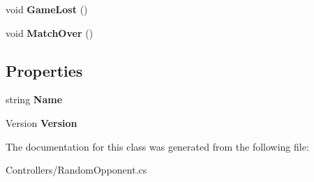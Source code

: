\begin{DoxyCompactItemize}
\item 
\hypertarget{class_m_b_c_1_1_controllers_1_1_random_bot_adcf9ec0052ac4f20b102979a4ed0771b}{void {\bfseries Game\-Lost} ()}\label{class_m_b_c_1_1_controllers_1_1_random_bot_adcf9ec0052ac4f20b102979a4ed0771b}

\item 
\hypertarget{class_m_b_c_1_1_controllers_1_1_random_bot_a5e0fd0e964cb95bbc22067b3915b2b1e}{void {\bfseries Match\-Over} ()}\label{class_m_b_c_1_1_controllers_1_1_random_bot_a5e0fd0e964cb95bbc22067b3915b2b1e}

\end{DoxyCompactItemize}
\subsection*{Properties}
\begin{DoxyCompactItemize}
\item 
\hypertarget{class_m_b_c_1_1_controllers_1_1_random_bot_aa85a65b41ecdec5aa7840900e90cd19f}{string {\bfseries Name}}\label{class_m_b_c_1_1_controllers_1_1_random_bot_aa85a65b41ecdec5aa7840900e90cd19f}

\item 
\hypertarget{class_m_b_c_1_1_controllers_1_1_random_bot_a8ecfc86ee10ebf3a1c1c88386f0e205c}{Version {\bfseries Version}}\label{class_m_b_c_1_1_controllers_1_1_random_bot_a8ecfc86ee10ebf3a1c1c88386f0e205c}

\end{DoxyCompactItemize}


The documentation for this class was generated from the following file\-:\begin{DoxyCompactItemize}
\item 
Controllers/Random\-Opponent.\-cs\end{DoxyCompactItemize}
